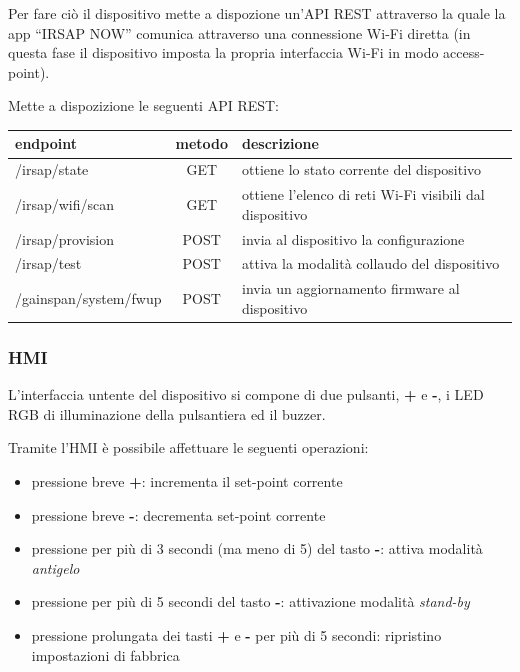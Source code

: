 \documentclass[a4paper,titlepage]{article}
\begin{document}
Per fare ciò il dispositivo mette a dispozione un'API REST attraverso la quale la
app ``IRSAP NOW'' comunica attraverso una connessione Wi-Fi diretta (in questa fase
il dispositivo imposta la propria interfaccia Wi-Fi in modo access-point).

Mette a dispozizione le seguenti API REST:

\begin{center}
\begin{tabular}{| l | c | l |}
    \hline \textbf{endpoint} & \textbf{metodo} & \textbf{descrizione} \\
    \hline /irsap/state & GET & ottiene lo stato corrente del dispositivo \\
    \hline /irsap/wifi/scan & GET & ottiene l'elenco di reti Wi-Fi visibili dal dispositivo \\
    \hline /irsap/provision & POST & invia al dispositivo la configurazione \\
    \hline /irsap/test & POST & attiva la modalità collaudo del dispositivo \\
    \hline /gainspan/system/fwup & POST & invia un aggiornamento firmware al dispositivo \\
    \hline
\end{tabular}
\end{center}

\subsubsection{HMI}

L'interfaccia untente del dispositivo si compone di due pulsanti, \textbf{+} e \textbf{-},
i LED RGB di illuminazione della pulsantiera ed il buzzer.

Tramite l'HMI è possibile affettuare le seguenti operazioni:

\begin{itemize}
    \item pressione breve \textbf{+}: incrementa il set-point corrente
    \item pressione breve \textbf{-}: decrementa set-point corrente
    \item pressione per più di 3 secondi (ma meno di 5) del tasto \textbf{-}:
        attiva modalità \textit{antigelo}
    \item pressione per più di 5 secondi del tasto \textbf{-}: attivazione modalità
        \textit{stand-by}
    \item pressione prolungata dei tasti \textbf{+} e \textbf{-} per più di 5 secondi:
        ripristino impostazioni di fabbrica
\end{itemize}
\end{document}
